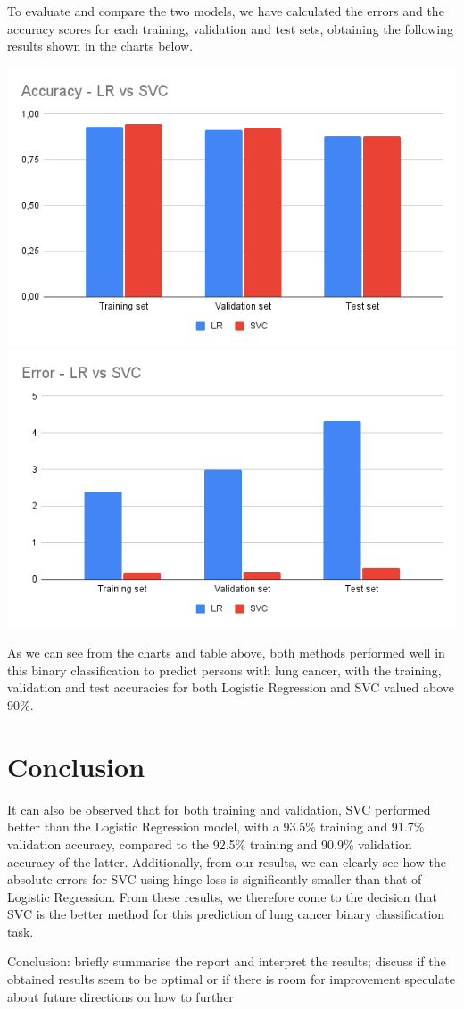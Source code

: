 \documentclass[a4paper,12pt]{article}
\begin{document}
To evaluate and compare the two models, we have calculated the errors and the accuracy scores for each training, validation and test sets, obtaining the following results shown in the charts below.

\includegraphics[height=0.3\textwidth]{./graphs/accuracy_chart.png}
\includegraphics[height=0.3\textwidth]{./graphs/error_chart.png}

As we can see from the charts and table above, both methods performed well in this binary classification to predict persons with lung cancer, with the training, validation and test accuracies for both Logistic Regression and SVC valued above 90\%.

\section{Conclusion}
\label{sec:org7b5c9d5}

It can also be observed that for both training and validation, SVC performed better than the Logistic Regression model, with a 93.5\% training and 91.7\% validation accuracy, compared to the 92.5\% training and 90.9\% validation accuracy of the latter.
Additionally, from our results, we can clearly see how the absolute errors for SVC using hinge loss is significantly smaller than that of Logistic Regression.
From these results, we therefore come to the decision that SVC is the better method for this prediction of lung cancer binary classification task.




Conclusion:
briefly summarise the report and interpret the results;
 discuss if the obtained results seem to be optimal or if there is room for improvement
speculate about future directions on how to further
\end{document}
